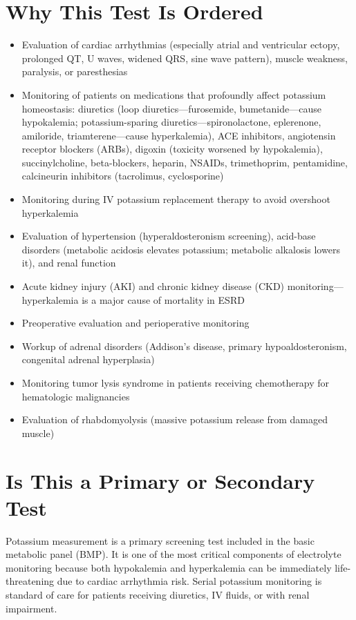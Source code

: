 \section*{Why This Test Is Ordered}
\begin{itemize}
  \item Evaluation of cardiac arrhythmias (especially atrial and ventricular ectopy, prolonged QT, U waves, widened QRS, sine wave pattern), muscle weakness, paralysis, or paresthesias
  \item Monitoring of patients on medications that profoundly affect potassium homeostasis: diuretics (loop diuretics---furosemide, bumetanide---cause hypokalemia; potassium-sparing diuretics---spironolactone, eplerenone, amiloride, triamterene---cause hyperkalemia), ACE inhibitors, angiotensin receptor blockers (ARBs), digoxin (toxicity worsened by hypokalemia), succinylcholine, beta-blockers, heparin, NSAIDs, trimethoprim, pentamidine, calcineurin inhibitors (tacrolimus, cyclosporine)
  \item Monitoring during IV potassium replacement therapy to avoid overshoot hyperkalemia
  \item Evaluation of hypertension (hyperaldosteronism screening), acid-base disorders (metabolic acidosis elevates potassium; metabolic alkalosis lowers it), and renal function
  \item Acute kidney injury (AKI) and chronic kidney disease (CKD) monitoring---hyperkalemia is a major cause of mortality in ESRD
  \item Preoperative evaluation and perioperative monitoring
  \item Workup of adrenal disorders (Addison's disease, primary hypoaldosteronism, congenital adrenal hyperplasia)
  \item Monitoring tumor lysis syndrome in patients receiving chemotherapy for hematologic malignancies
  \item Evaluation of rhabdomyolysis (massive potassium release from damaged muscle)
\end{itemize}

\section*{Is This a Primary or Secondary Test}
Potassium measurement is a primary screening test included in the basic metabolic panel (BMP). It is one of the most critical components of electrolyte monitoring because both hypokalemia and hyperkalemia can be immediately life-threatening due to cardiac arrhythmia risk. Serial potassium monitoring is standard of care for patients receiving diuretics, IV fluids, or with renal impairment.

